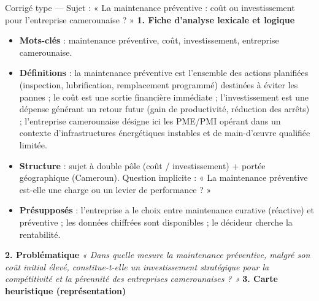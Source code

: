 \documentclass[11pt]{article}
\newcommand{\cle}[1]{{\popxbold\color{popdark}#1}}
\newcounter{popsec}
\newcounter{popsub}
\newcommand{\courssub}[1]{%
  \stepcounter{popsub}%
  \par\vspace{9pt}\noindent{\popxbold\fontsize{11.5}{13}\selectfont\color{popink}{\color{poporange}\thepopsec.\thepopsub}\hspace{6pt}#1}\par\nopagebreak\vspace{4pt}
}
\begin{document}
\courssub{Démarche et corrigé commenté}
\begin{exoresolu}{Corrigé type — Sujet : « La maintenance préventive : coût ou investissement pour l'entreprise camerounaise ? »}
\textbf{1. Fiche d'analyse lexicale et logique}
\begin{itemize}
    \item \textbf{Mots-clés} : maintenance préventive, coût, investissement, entreprise camerounaise.
    \item \textbf{Définitions} : la \cle{maintenance préventive} est l'ensemble des actions planifiées (inspection, lubrification, remplacement programmé) destinées à éviter les pannes ; le \cle{coût} est une sortie financière immédiate ; l'\cle{investissement} est une dépense générant un retour futur (gain de productivité, réduction des arrêts) ; l'\cle{entreprise camerounaise} désigne ici les PME/PMI opérant dans un contexte d'infrastructures énergétiques instables et de main-d'œuvre qualifiée limitée.
    \item \textbf{Structure} : sujet à double pôle (coût / investissement) + portée géographique (Cameroun). Question implicite : « La maintenance préventive est-elle une charge ou un levier de performance ? »
    \item \textbf{Présupposés} : l'entreprise a le choix entre maintenance curative (réactive) et préventive ; les données chiffrées sont disponibles ; le décideur cherche la rentabilité.
\end{itemize}
\textbf{2. Problématique}
\emph{« Dans quelle mesure la maintenance préventive, malgré son coût initial élevé, constitue-t-elle un investissement stratégique pour la compétitivité et la pérennité des entreprises camerounaises ? »}
\textbf{3. Carte heuristique (représentation)}
\begin{center}
\begin{center}\end{center}
\vspace{-2pt}
\begin{tcbraster}[raster columns=2,raster equal height=rows,raster column skip=6pt,raster row skip=6pt,enhanced,blankest]
\begin{tcolorbox}[enhanced,colback=white,colframe=popgreen!60,boxrule=0.9pt,arc=3pt,title={I. Coût apparent},fonttitle=\bfseries\scriptsize,coltitle=white,colbacktitle=popgreen!60,left=4pt,right=4pt,top=2pt,bottom=2pt,boxsep=1pt,toptitle=1.5pt,bottomtitle=1.5pt,halign=left]

\end{tcolorbox}
\end{tcbraster}
\end{center}
\end{exoresolu}
\end{document}
